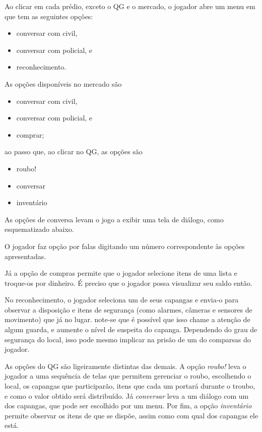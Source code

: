 Ao clicar em cada prédio, exceto o QG e o mercado, o jogador abre um menu em que tem as seguintes opções:
\begin{itemize}
\item conversar com civil,
\item conversar com policial, e
\item reconhecimento.
\end{itemize}

As opções disponíveis no mercado são
\begin{itemize}
\item conversar com civil,
\item conversar com policial, e
\item comprar;
\end{itemize}
ao passo que, ao clicar no QG, as opções são
\begin{itemize}
\item roubo!
\item conversar
\item inventário
\end{itemize}

As opções de conversa levam o jogo a exibir uma tela de diálogo, como esquematizado abaixo.

%
%
%

O jogador faz opção por falas digitando um número correspondente às opções apresentadas.

Já a opção de compras permite que o jogador selecione itens de uma lista e troque-os por dinheiro. É preciso que o jogador possa visualizar seu saldo então.

No reconhecimento, o jogador seleciona um de seus capangas e envia-o para observar a disposição e itens de segurança (como alarmes, câmeras e sensores de movimento) que já no lugar. note-se que é possível que isso chame a atenção de algum guarda, e aumente o nível de suspeita do capanga. Dependendo do grau de segurança do local, isso pode mesmo implicar na prisão de um do comparsas do jogador.

As opções do QG são ligeiramente distintas das demais. A opção \emph{roubo!} leva o jogador a uma sequência de telas que permitem gerenciar o roubo, escolhendo o local, os capangas que participarão, itens que cada um portará durante o troubo, e como o valor obtido será distribuído. Já \emph{conversar} leva a um diálogo com um dos capangas, que pode ser escolhido por um menu. Por fim, a opção \emph{inventário} permite observar os itens de que se dispõe, assim como com qual dos capangas ele está.

